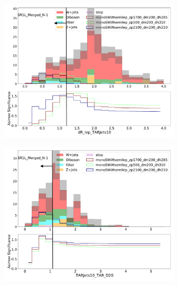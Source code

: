 \begin{figure}[htbp]
\begin{subfigure}{0.49\textwidth}
     \caption{\metsig}
     \end{subfigure}
     \begin{subfigure}{0.49\textwidth}
     \includegraphics[width = 0.98\textwidth]{Figures/4/N1n/dR_lep_TARJets10.pdf}
     \caption{\drTARl}
     \end{subfigure}
     \begin{subfigure}{0.49\textwidth}
     \includegraphics[width = 0.98\textwidth]{Figures/4/N1n/TARJets10_TAR_D20.pdf}
     \caption{\DtwoTAR}
     \end{subfigure}
     \begin{subfigure}{0.49\textwidth}

\end{subfigure}
\end{figure}
